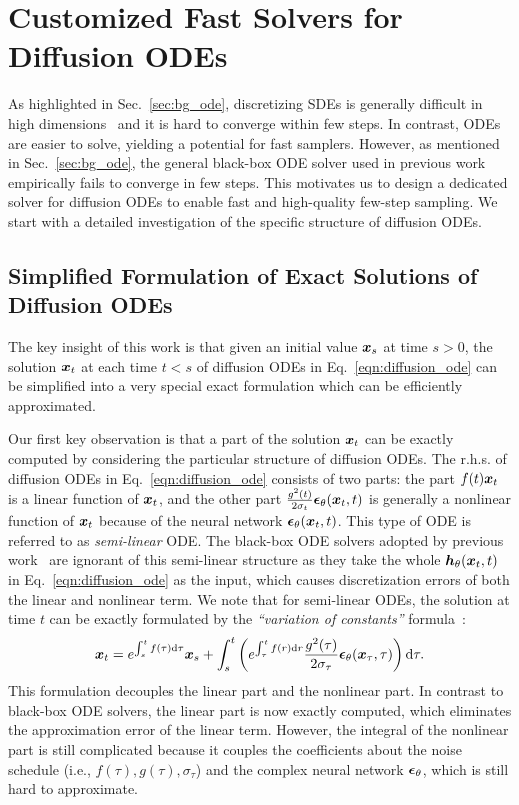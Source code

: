 \section{Customized  Fast Solvers for Diffusion ODEs }
\label{sec:solver}
As highlighted in Sec.~\ref{sec:bg_ode}, discretizing SDEs is generally difficult in high dimensions~\citep[Chap. 11]{kloeden1992Numerical} and it is hard to converge within few steps. In contrast, ODEs are easier to solve, yielding a potential for fast samplers.
However, as mentioned in Sec.~\ref{sec:bg_ode}, the general black-box ODE solver used in previous work~\citep{song2020score} empirically fails to converge in few steps. This motivates us to design a dedicated solver for diffusion ODEs to enable fast and high-quality few-step sampling. 
We start with a detailed investigation of the specific structure of diffusion ODEs.




\subsection{Simplified Formulation of Exact Solutions of Diffusion ODEs}
\label{sec:exact_solution}
The key insight of this work is that given an initial value $\bm{x}_s$ at time $s>0$, the solution $\bm{x}_t$ at each time $t < s$ of diffusion ODEs in Eq.~\eqref{eqn:diffusion_ode} can be simplified into a very special exact formulation which can be efficiently approximated. 



Our first key observation is that a part of the solution $\bm{x}_t$ can be exactly computed by considering the particular structure of diffusion ODEs.
The r.h.s. of diffusion ODEs in Eq.~\eqref{eqn:diffusion_ode} consists of two parts: the part $f(t)\bm{x}_t$ is a linear function of $\bm{x}_t$, and the other part $\frac{g^2(t)}{2\sigma_t} \bm{\epsilon}_\theta(\bm{x}_t,t)$ is generally a nonlinear function of $\bm{x}_t$ because of the neural network $\bm{\epsilon}_\theta(\bm{x}_t,t)$. This type of ODE is referred to as \textit{semi-linear} ODE. The black-box ODE solvers adopted by previous work~\cite{song2020score} are ignorant of this semi-linear structure as they take the whole $\bm{h}_\theta(\bm{x}_t,t)$ in Eq.~\eqref{eqn:diffusion_ode} as the input, which causes discretization errors of both the linear and nonlinear term. 
We note that for semi-linear ODEs, the solution at time $t$ can be exactly formulated by the \textit{``variation of constants''} formula~\citep{atkinson2011numerical}:
\begin{equation}
\label{eqn:variation_of_constants}
    \bm{x}_t = e^{\int_s^t f(\tau)\dd\tau}\bm{x}_s
        + \int_s^t \left(e^{\int_\tau^t f(r)\dd r}\frac{g^2(\tau)}{2\sigma_\tau} \bm{\epsilon}_\theta(\bm{x}_\tau,\tau)\right)\mathrm{d}\tau.
\end{equation}
This formulation decouples the linear part and the nonlinear part. In contrast to black-box ODE solvers, the linear part is now exactly computed, which eliminates the approximation error of the linear term. However, the integral of the nonlinear part is still complicated because it couples the coefficients about the noise schedule (i.e., $f(\tau),g(\tau),\sigma_\tau$) and the complex neural network $\bm{\epsilon}_\theta$, which is still hard to approximate.

